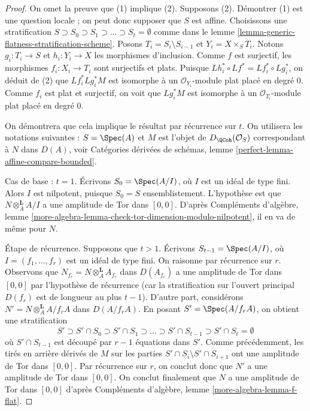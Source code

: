 \begin{proof}
On omet la preuve que (1) implique (2). Supposons (2). Démontrer (1)
est une question locale ; on peut donc supposer que $S$ est affine.
Choisissons une stratification
$S \supset S_0 \supset S_1 \supset \ldots \supset S_t = \emptyset$
comme dans le lemme \ref{lemma-generic-flatness-stratification-scheme}.
Posons $T_i = S_i \setminus S_{i - 1}$ et $Y_i = X \times_S T_i$.
Notons $g_i : T_i \to S$ et $h_i : Y_i \to X$ les morphismes d'inclusion.
Comme $f$ est surjectif, les morphismes $f_i : X_i \to T_i$
sont surjectifs et plats. Puisque
$Lh_i^* \circ Lf^* = Lf_i^* \circ Lg_i^*$, on déduit de (2) que
$Lf_i^* Lg_i^*M$ est isomorphe à un $\mathcal{O}_{Y_i}$-module plat
placé en degré $0$. Comme $f_i$ est plat et surjectif, on voit que
$Lg_i^*M$ est isomorphe à un $\mathcal{O}_{T_i}$-module plat
placé en degré $0$.

\medskip\noindent
On démontrera que cela implique le résultat par récurrence sur $t$.
On utilisera les notations suivantes : $S = \Spec(A)$ et $M$
est l'objet de $D_\QCoh(\mathcal{O}_S)$ correspondant à
$N$ dans $D(A)$, voir Catégories dérivées de schémas, lemme
\ref{perfect-lemma-affine-compare-bounded}.

\medskip\noindent
Cas de base : $t = 1$. Écrivons $S_0 = \Spec(A/I)$, où
$I$ est un idéal de type fini. Alors $I$ est nilpotent, puisque $S_0 = S$
ensemblistement. L'hypothèse est que $N \otimes_A^\mathbf{L} A/I$
a une amplitude de Tor dans $[0, 0]$. D'après Compléments d'algèbre, lemme
\ref{more-algebra-lemma-check-tor-dimension-modulo-nilpotent},
il en va de même pour $N$.

\medskip\noindent
Étape de récurrence. Supposons que $t > 1$. Écrivons $S_{t - 1} = \Spec(A/I)$,
où $I = (f_1, \ldots, f_r)$ est un idéal de type fini.
On raisonne par récurrence sur $r$. Observons que
$N_{f_r} = N \otimes_A^\mathbf{L} A_{f_r}$ dans $D(A_{f_r})$
a une amplitude de Tor dans $[0, 0]$ par l'hypothèse de récurrence
(car la stratification sur l'ouvert principal $D(f_r)$ est de longueur
au plus $t - 1$). D'autre part, considérons
$N' = N \otimes_A^\mathbf{L} A/f_rA$ dans $D(A/f_rA)$.
En posant $S' = \Spec(A/f_rA)$, on obtient une stratification
$$
S' \supset S' \cap S_0 \supset S' \cap S_1 \supset \ldots \supset
S' \cap S_{t - 1} \supset
S' \cap S_t = \emptyset
$$
où $S' \cap S_{t - 1}$ est découpé par $r - 1$ équations dans $S'$.
Comme précédemment, les tirés en arrière dérivés de $M$ sur les parties
$S' \cap S_i \setminus S' \cap S_{i + 1}$ ont une amplitude de Tor
dans $[0, 0]$. Par récurrence sur $r$, on conclut donc que
$N'$ a une amplitude de Tor dans $[0, 0]$.
On conclut finalement que $N$ a une amplitude de Tor dans $[0, 0]$
d'après Compléments d'algèbre, lemme \ref{more-algebra-lemma-f-flat}.
\end{proof}

